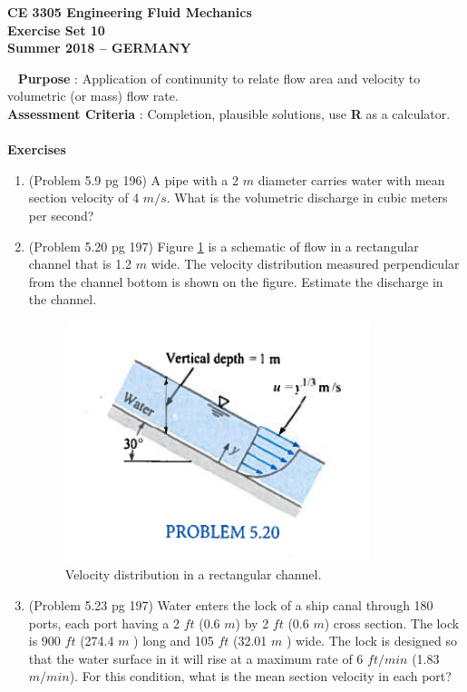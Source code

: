 \documentclass[12pt]{article}
\begin{document}
\begingroup
\begin{center}
{\textbf{{ CE 3305 Engineering Fluid Mechanics} \\ Exercise Set 10 \\ Summer 2018 -- GERMANY} }
\end{center}
\endgroup
\begingroup
~\newline
\textbf{Purpose} :  Application of continunity to relate flow area and velocity to volumetric (or mass) flow rate. \\
\textbf{Assessment Criteria} : Completion, plausible solutions, use \textbf{R} as a calculator. \\~\\
\textbf{Exercises}

\begin{enumerate}
\item (Problem 5.9 pg 196)  A pipe with a 2 $m$ diameter carries water with mean section velocity of 4 $m/s$.  What is the volumetric discharge in cubic meters per second?

\item (Problem 5.20 pg 197) Figure \ref{fig:OpenChannel} is a schematic of flow in a rectangular channel that is 1.2 $m$ wide.   The velocity distribution measured perpendicular from the channel bottom is shown on the figure.  Estimate the discharge in the channel.

\begin{figure}[h!] %
   \centering
   \includegraphics[width=3.5in]{OpenChannel.jpg} 
   \caption{Velocity distribution in a rectangular channel.}
   \label{fig:OpenChannel}
\end{figure}

\item (Problem 5.23 pg 197) Water enters the lock of a ship canal through 180 ports, each port having a 2 $ft$ (0.6 $m$) by 2 $ft$ (0.6 $m$) cross section.  The lock is 900 $ft$ (274.4 $m$ ) long and 105 $ft$ (32.01 $m$ ) wide.
The lock is designed so that the water surface in it will rise at a maximum rate of 6 $ft/min$ (1.83 $m/min$).   For this condition, what is the mean section velocity in each port?

\end{enumerate}
\end{document}
